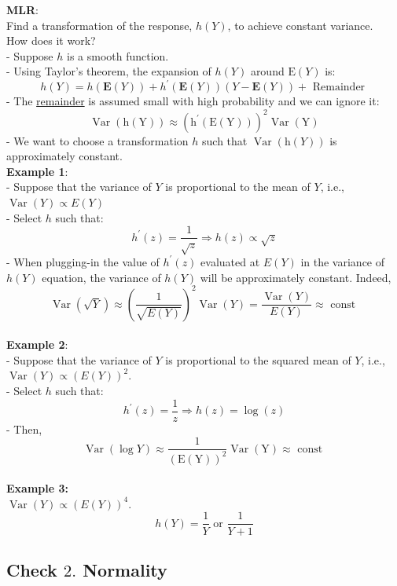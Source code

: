 \documentclass[11pt,a4paper]{article}
\begin{document}
\textbf{MLR}:\\
Find a transformation of the response, $h(Y )$, to achieve constant variance.\\
How does it work?\\
- Suppose $h$ is a smooth function.\\
- Using Taylor's theorem, the expansion of $h(Y)$ around $\mathrm{E}(Y)$ is:
$$
h(Y)=h(\mathbf{E}(Y))+h^{\prime}(\mathbf{E}(Y))(Y-\mathbf{E}(Y))+\text { Remainder }
$$
- The \underline{remainder} is assumed small with high probability and we can ignore it:
$$
\operatorname{Var}(\mathrm{h}(\mathrm{Y})) \approx\left(\mathrm{h}^{\prime}(\mathrm{E}(\mathrm{Y}))\right)^{2} \operatorname{Var}(\mathrm{Y})
$$
- We want to choose a transformation $h$ such that $\operatorname{Var}(\mathrm{h}(Y))$ is approximately constant.\\

\textbf{Example 1}:\\
- Suppose that the variance of $Y$ is proportional to the mean of $Y$, i.e., $\operatorname{Var}(Y) \propto E(Y)$\\
- Select $h$ such that:
$$
h^{\prime}(z)=\frac{1}{\sqrt{z}} \Rightarrow h(z) \propto \sqrt{z}
$$
- When plugging-in the value of $h^{\prime}(z)$ evaluated at $E(Y)$ in the variance of $h(Y)$ equation, the variance of $h(Y)$ will be approximately constant. Indeed,
$$
\operatorname{Var}(\sqrt{Y}) \approx\left(\frac{1}{\sqrt{E(Y)}}\right)^{2} \operatorname{Var}(Y)=\frac{\operatorname{Var}(Y)}{E(Y)} \approx \text { const }
$$\\

\textbf{Example 2}:\\
- Suppose that the variance of $Y$ is proportional to the squared mean of $Y$, i.e., $\operatorname{Var}(Y) \propto(E(Y))^{2}$.\\
- Select $h$ such that:
$$
h^{\prime}(z)=\frac{1}{z} \Rightarrow h(z)=\log (z)
$$
- Then,
$$
\operatorname{Var}(\log Y) \approx \frac{1}{(\mathrm{E}(\mathrm{Y}))^{2}} \operatorname{Var}(\mathrm{Y}) \approx \text { const }
$$\\

\textbf{Example 3:}\\
$\operatorname{Var}(Y) \propto(E(Y))^{4}$.\\
$$h(Y)=\frac{1}{Y}\text{ or }\frac{1}{Y+1}$$






\subsection{Check $2.$ Normality}
\end{document}
